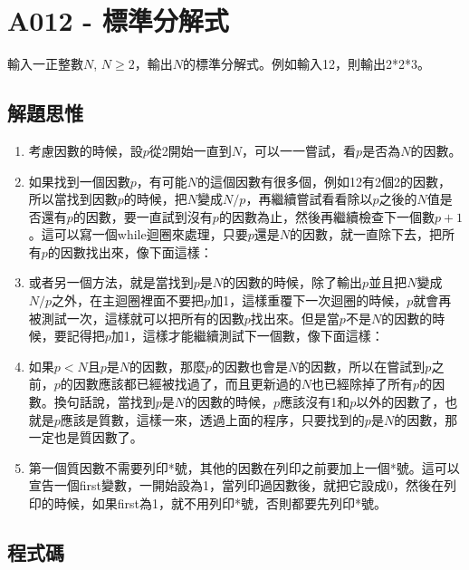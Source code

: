 \section{A012 - 標準分解式}
輸入一正整數$N$, $N\ge 2$，輸出$N$的標準分解式。例如輸入12，則輸出2*2*3。

\subsection{解題思惟}
\begin{enumerate}
	\item 考慮因數的時候，設$p$從2開始一直到$N$，可以一一嘗試，看$p$是否為$N$的因數。
	\item 如果找到一個因數$p$，有可能$N$的這個因數有很多個，例如12有2個2的因數，所以當找到因數$p$的時候，把$N$變成$N/p$，再繼續嘗試看看除以$p$之後的$N$值是否還有$p$的因數，要一直試到沒有$p$的因數為止，然後再繼續檢查下一個數$p+1$。這可以寫一個while迴圈來處理，只要$p$還是$N$的因數，就一直除下去，把所有$p$的因數找出來，像下面這樣：
	\item 或者另一個方法，就是當找到$p$是$N$的因數的時候，除了輸出$p$並且把$N$變成$N/p$之外，在主迴圈裡面不要把$p$加1，這樣重覆下一次迴圈的時候，$p$就會再被測試一次，這樣就可以把所有的因數$p$找出來。但是當$p$不是$N$的因數的時候，要記得把$p$加1，這樣才能繼續測試下一個數，像下面這樣：
	\item 如果$p<N$且$p$是$N$的因數，那麼$p$的因數也會是$N$的因數，所以在嘗試到$p$之前，$p$的因數應該都已經被找過了，而且更新過的$N$也已經除掉了所有$p$的因數。換句話說，當找到$p$是$N$的因數的時候，$p$應該沒有1和$p$以外的因數了，也就是$p$應該是質數，這樣一來，透過上面的程序，只要找到的$p$是$N$的因數，那一定也是質因數了。
	\item 第一個質因數不需要列印*號，其他的因數在列印之前要加上一個*號。這可以宣告一個first變數，一開始設為1，當列印過因數後，就把它設成0，然後在列印的時候，如果first為1，就不用列印*號，否則都要先列印*號。
\end{enumerate}
\subsection{程式碼}
